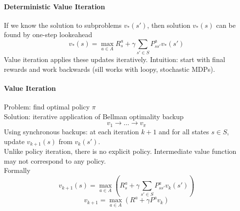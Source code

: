 \documentclass[10pt]{report}
\begin{document}
\paragraph{Deterministic Value Iteration} If we know the solution to subproblems $v_*(s')$, then solution $v_*(s)$ can be found by one-step lookeahead
$$v_*(s) = \max_{a\in A} R_s^a + \gamma\sum_{s'\in S} P_{ss'}^av_*(s')$$
Value iteration applies these updates iteratively. Intuition: start with final rewards and work backwards (sill works with loopy, stochastic MDPs).
\paragraph{Value Iteration} Problem: find optimal policy $\pi$\\
Solution: iterative application of Bellman optimality backup
$$v_1\rightarrow\ldots\rightarrow v_\pi$$
Using synchronous backups: at each iteration $k+1$ and for all states $s\in S$, update $v_{k+1}(s)$ from $v_k(s')$.\\
Unlike policy iteration, there is no explicit policy. Intermediate value function may not correspond to any policy.\\
Formally
$$v_{k+1}(s) = \max_{a\in A}\left(R_s^a + \gamma\sum_{s'\in S} P_{ss'}^a v_k(s')\right)$$
$$v_{k+1} = \max_{a\in A}(R^a + \gamma P^a v_k)$$
\end{document}
